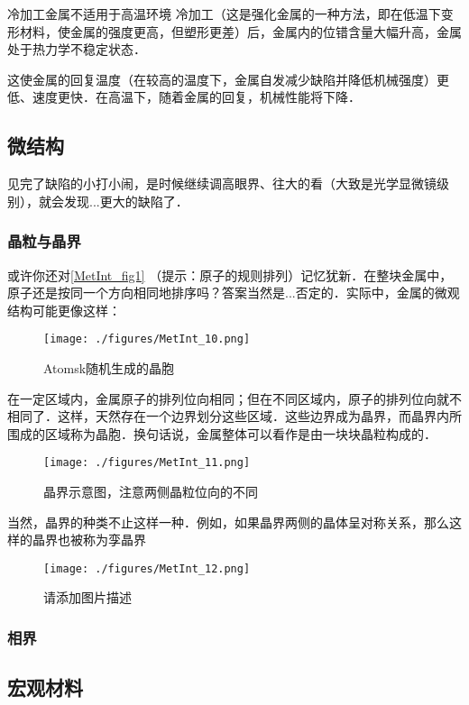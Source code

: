 \begin{example}{冷加工金属不适用于高温环境}
冷加工（这是强化金属的一种方法，即在低温下变形材料，使金属的强度更高，但塑形更差）后，金属内的位错含量大幅升高，金属处于热力学不稳定状态．

这使金属的回复温度（在较高的温度下，金属自发减少缺陷并降低机械强度）更低、速度更快．在高温下，随着金属的回复，机械性能将下降．
\end{example}

\subsection{微结构}
见完了缺陷的小打小闹，是时候继续调高眼界、往大的看（大致是光学显微镜级别），就会发现...更大的缺陷了．

\subsubsection{晶粒与晶界}
或许你还对\autoref{MetInt_fig1} （提示：原子的规则排列）记忆犹新．在整块金属中，原子还是按同一个方向相同地排序吗？答案当然是...否定的．实际中，金属的微观结构可能更像这样：
\begin{figure}[ht]
\centering
\texttt{[image: ./figures/MetInt\_10.png]}
\caption{Atomsk随机生成的晶胞} \label{MetInt_fig10}
\end{figure}
在一定区域内，金属原子的排列位向相同；但在不同区域内，原子的排列位向就不相同了．这样，天然存在一个边界划分这些区域．这些边界成为晶界，而晶界内所围成的区域称为晶胞．换句话说，金属整体可以看作是由一块块晶粒构成的．
\begin{figure}[ht]
\centering
\texttt{[image: ./figures/MetInt\_11.png]}
\caption{晶界示意图，注意两侧晶粒位向的不同} \label{MetInt_fig11}
\end{figure}
当然，晶界的种类不止这样一种．例如，如果晶界两侧的晶体呈对称关系，那么这样的晶界也被称为孪晶界
\begin{figure}[ht]
\centering
\texttt{[image: ./figures/MetInt\_12.png]}
\caption{请添加图片描述} \label{MetInt_fig12}
\end{figure}

\subsubsection{相界}

\subsection{宏观材料}
